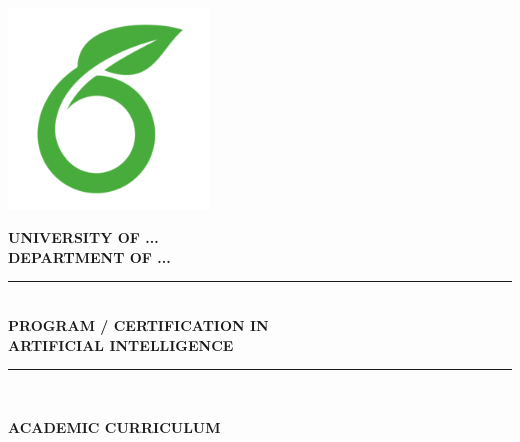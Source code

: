 \begin{titlepage}
\newcommand{\HRule}{\rule{\linewidth}{0.5mm}}                           %
\center


\includegraphics[width=0.4\textwidth]{logo.png}\\[0.2cm]  %

\vfill

\textbf{\Large UNIVERSITY OF ...  }\\
\textbf{\Large DEPARTMENT OF ... }\\

\vfill

\HRule \\[0.8cm]
\textbf{\Large PROGRAM / CERTIFICATION IN }\\[0.2cm]
\textbf{\Large ARTIFICIAL INTELLIGENCE}\\[0.8cm]
\HRule \\

\vfill


\textbf{\Large ACADEMIC CURRICULUM}\\[0.8cm]


\vfill
\end{titlepage}